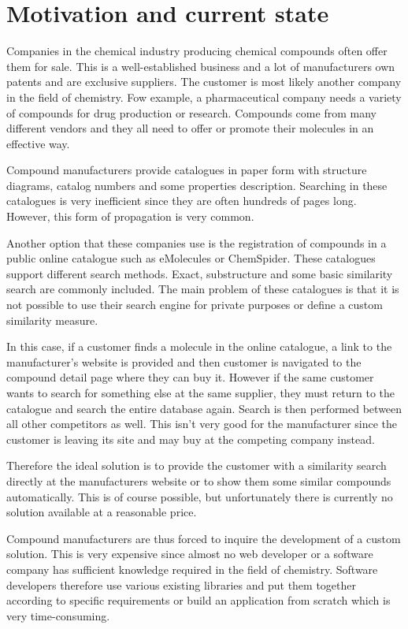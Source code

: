 \documentclass[thesis=M,english]{FITthesis}[2012/10/20]
\begin{document}
\section{Motivation and current state}
Companies in the chemical industry producing chemical compounds often offer them for sale. This is a well-established business and a lot of manufacturers own patents and are exclusive suppliers. The customer is most likely another company in the field of chemistry. Fow example, a pharmaceutical company needs a variety of compounds for drug production or research. Compounds come from many different vendors and they all need to offer or promote their molecules in an effective way.

Compound manufacturers provide catalogues in paper form with structure diagrams, catalog numbers and some properties description. Searching in these catalogues is very inefficient since they are often hundreds of pages long. However, this form of propagation is very common.

Another option that these companies use is the registration of compounds in a public online catalogue such as eMolecules or ChemSpider. These catalogues support different search methods. Exact, substructure and some basic similarity search are commonly included. The main problem of these catalogues is that it is not possible to use their search engine for private purposes or define a custom similarity measure.

In this case, if a customer finds a molecule in the online catalogue, a link to the manufacturer's website is provided and then customer is navigated to the compound detail page where they can buy it. However if the same customer wants to search for something else at the same supplier, they must return to the catalogue and search the entire database again. Search is then performed between all other competitors as well. This isn’t very good for the manufacturer since the customer is leaving its site and may buy at the competing company instead.

Therefore the ideal solution is to provide the customer with a similarity search directly at the manufacturers website or to show them some similar compounds automatically. This is of course possible, but unfortunately there is currently no solution available at a reasonable price. 

Compound manufacturers are thus forced to inquire the development of a custom solution. This is very expensive since almost no web developer or a software company has sufficient knowledge required in the field of chemistry. Software developers therefore use various existing libraries and put them together according to specific requirements or build an application from scratch which is very time-consuming.
\end{document}
